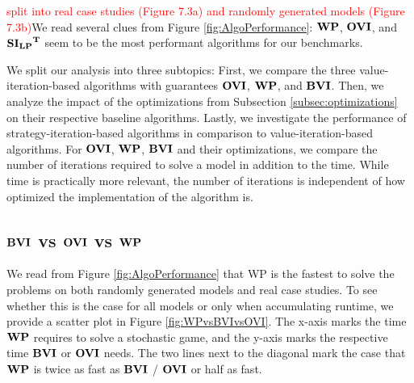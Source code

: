 \textcolor{red}{split into real case studies (Figure 7.3a) and randomly generated models (Figure 7.3b)}We read several clues from Figure \ref{fig:AlgoPerformance}:
$\mathbf{WP}$, $\mathbf{OVI}$, and $\mathbf{\mathbf{SI_{LP}}^T}$ seem to be the most performant algorithms for our benchmarks.

We split our analysis into three subtopics: 
First, we compare the three value-iteration-based algorithms with guarantees $\mathbf{OVI}$, $\mathbf{WP}$, and $\mathbf{BVI}$. 
Then, we analyze the impact of the optimizations from Subsection \ref{subsec:optimizations} on their respective baseline algorithms.
Lastly, we investigate the performance of strategy-iteration-based algorithms in comparison to value-iteration-based algorithms.
For $\mathbf{OVI}$, $\mathbf{WP}$, $\mathbf{BVI}$ and their optimizations, we compare the number of iterations required to solve a model in addition to the time.
While time is practically more relevant, the number of iterations is independent of how optimized the implementation of the algorithm is.
\FloatBarrier

\subsection{$\mathbf{BVI}$ vs $\mathbf{OVI}$ vs $\mathbf{WP}$}
We read from Figure \ref{fig:AlgoPerformance} that WP is the fastest to solve the problems on both randomly generated models and real case studies.
To see whether this is the case for all models or only when accumulating runtime, we provide a scatter plot in Figure \ref{fig:WPvsBVIvsOVI}.
The x-axis marks the time $\mathbf{WP}$ requires to solve a stochastic game, and the y-axis marks the respective time $\mathbf{BVI}$ or $\mathbf{OVI}$ needs.
The two lines next to the diagonal mark the case that $\mathbf{WP}$ is twice as fast as $\mathbf{BVI}$ / $\mathbf{OVI}$ or half as fast.

